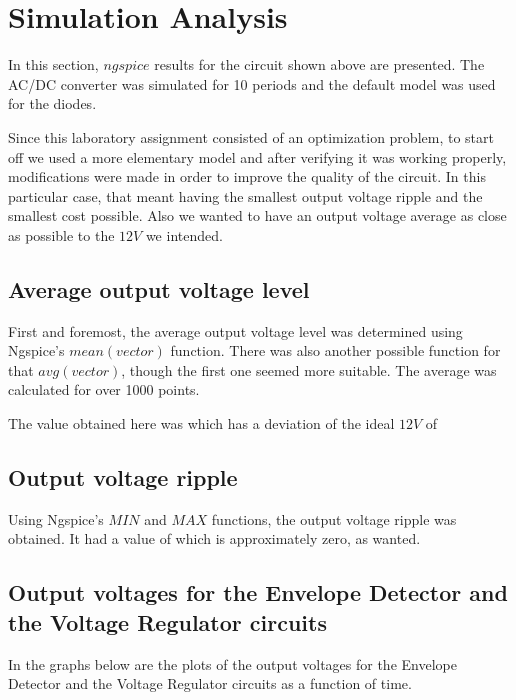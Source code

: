 \section{Simulation Analysis}
\label{sec:simulation}

In this section, $ngspice$ results for the circuit shown above are presented. The AC/DC converter was simulated for 10 periods and the default model was used for the diodes.

Since this laboratory assignment consisted of an optimization problem, to start off we used a more elementary model and after verifying it was working properly, modifications were made in order to improve the quality of the circuit. In this particular case, that meant having the smallest output voltage ripple and the smallest cost possible. Also we wanted to have an output voltage average as close as possible to the $12 V$ we intended.


\subsection{Average output voltage level}
First and foremost, the average output voltage level was determined using Ngspice's $mean(vector)$ function. There was also another possible function for that $avg(vector)$, though the first one seemed more suitable. The average was calculated for over 1000 points.

The value obtained here was %
which has a deviation of the ideal $12 V$ of %



\subsection{Output voltage ripple}
Using Ngspice's $MIN$ and $MAX$ functions, the output voltage ripple was obtained. It had a value of %
which is approximately zero, as wanted.






\subsection{Output voltages for the Envelope Detector and the Voltage Regulator circuits}
In the graphs below are the plots of the output voltages for the Envelope Detector and the Voltage Regulator circuits as a function of time.


